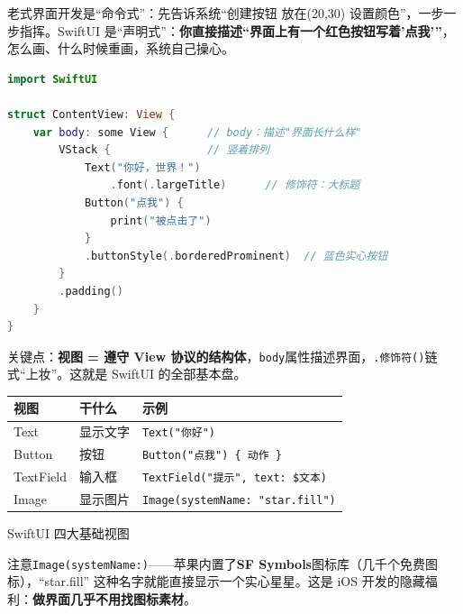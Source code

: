 


老式界面开发是“命令式”：先告诉系统“创建按钮 放在(20,30) 设置颜色”，一步一步指挥。SwiftUI 是“声明式”：\textbf{你直接描述“界面上有一个红色按钮写着'点我'”}，怎么画、什么时候重画，系统自己操心。

\begin{lstlisting}[language=Swift]
import SwiftUI

struct ContentView: View {
    var body: some View {      // body：描述"界面长什么样"
        VStack {               // 竖着排列
            Text("你好，世界！")
                .font(.largeTitle)      // 修饰符：大标题
            Button("点我") {
                print("被点击了")
            }
            .buttonStyle(.borderedProminent)  // 蓝色实心按钮
        }
        .padding()
    }
}
\end{lstlisting}

关键点：\textbf{视图 = 遵守 View 协议的结构体}，\texttt{body}属性描述界面，\texttt{.\allowbreak 修饰符()}链式“上妆”。这就是 SwiftUI 的全部基本盘。


\begin{center}
\begin{tabularx}{\linewidth}{|X|X|X|}
\hline
\textbf{视图} & \textbf{干什么} & \textbf{示例} \tabularnewline
\hline
Text & 显示文字 & \texttt{Text("你好")} \tabularnewline
Button & 按钮 & \texttt{Button("点我") \{ 动作 \}} \tabularnewline
TextField & 输入框 & \texttt{TextField("提示", text: \$文本)} \tabularnewline
Image & 显示图片 & \texttt{Image(systemName: "star.\allowbreak fill")} \tabularnewline
\hline
\end{tabularx}
\end{center}

\begin{center}\small\color{gray}SwiftUI 四大基础视图\end{center}

注意\texttt{Image(systemName:)}——苹果内置了\textbf{SF Symbols}图标库（几千个免费图标），“star.fill” 这种名字就能直接显示一个实心星星。这是 iOS 开发的隐藏福利：\textbf{做界面几乎不用找图标素材}。

